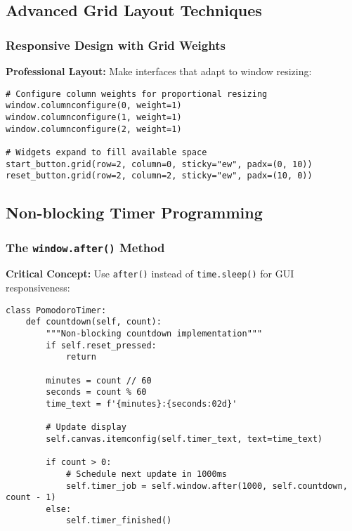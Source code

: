 \documentclass[12pt,a4paper]{article}
\begin{document}
\subsection{Advanced Grid Layout Techniques}

\subsubsection{Responsive Design with Grid Weights}
\textbf{Professional Layout:} Make interfaces that adapt to window resizing:

\begin{lstlisting}
# Configure column weights for proportional resizing
window.columnconfigure(0, weight=1)
window.columnconfigure(1, weight=1) 
window.columnconfigure(2, weight=1)

# Widgets expand to fill available space
start_button.grid(row=2, column=0, sticky="ew", padx=(0, 10))
reset_button.grid(row=2, column=2, sticky="ew", padx=(10, 0))
\end{lstlisting}

\subsection{Non-blocking Timer Programming}

\subsubsection{The \texttt{window.after()} Method}
\textbf{Critical Concept:} Use \texttt{after()} instead of \texttt{time.sleep()} for GUI responsiveness:

\begin{tcolorbox}[colback=green!5!white,colframe=green!75!black,title=Professional Timer Implementation]
\begin{lstlisting}
class PomodoroTimer:
    def countdown(self, count):
        """Non-blocking countdown implementation"""
        if self.reset_pressed:
            return
            
        minutes = count // 60
        seconds = count % 60
        time_text = f'{minutes}:{seconds:02d}'
        
        # Update display
        self.canvas.itemconfig(self.timer_text, text=time_text)
        
        if count > 0:
            # Schedule next update in 1000ms
            self.timer_job = self.window.after(1000, self.countdown, count - 1)
        else:
            self.timer_finished()
\end{lstlisting}
\end{tcolorbox}
\end{document}
